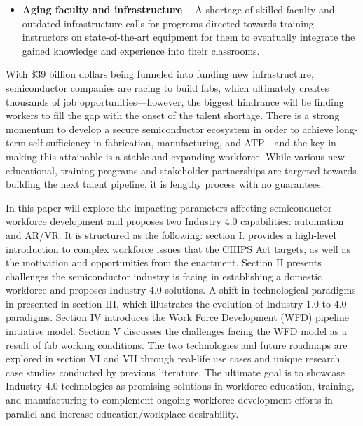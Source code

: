 \begin{itemize}
    \item \textbf{Aging faculty and infrastructure – }A shortage of skilled faculty and outdated infrastructure calls for programs directed towards training instructors on state-of-the-art equipment for them to eventually integrate the gained knowledge and experience into their classrooms.
    
\end{itemize}

With \$39 billion dollars being funneled into funding new infrastructure, semiconductor companies are racing to build fabs, which ultimately creates thousands of job opportunities—however, the biggest hindrance will be finding workers to fill the gap with the onset of the talent shortage. There is a strong momentum to develop a secure semiconductor ecosystem in order to achieve long-term self-sufficiency in fabrication, manufacturing, and ATP—and the key in making this attainable is a stable and expanding workforce. While various new educational, training programs and stakeholder partnerships are targeted towards building the next talent pipeline, it is lengthy process with no guarantees. 

In this paper will explore the impacting parameters affecting semiconductor workforce development and proposes two Industry 4.0 capabilities: automation and AR/VR. It is structured as the following: section I. provides a high-level introduction to complex workforce issues that the CHIPS Act targets, as well as the motivation and opportunities from the enactment. Section II presents challenges the semiconductor industry is facing in establishing a domestic workforce and proposes Industry 4.0 solutions. A shift in technological paradigms in presented in section III, which illustrates the evolution of Industry 1.0 to 4.0 paradigms. Section IV introduces the Work Force Development (WFD) pipeline initiative model. Section V  discusses the challenges facing the WFD model as a result of fab working conditions.  The two technologies and future roadmaps are explored in section VI and VII through real-life use cases and unique research case studies conducted by previous literature. The ultimate goal is to showcase Industry 4.0 technologies as promising solutions in workforce education, training, and manufacturing to complement ongoing workforce development efforts in parallel and increase education/workplace desirability.

